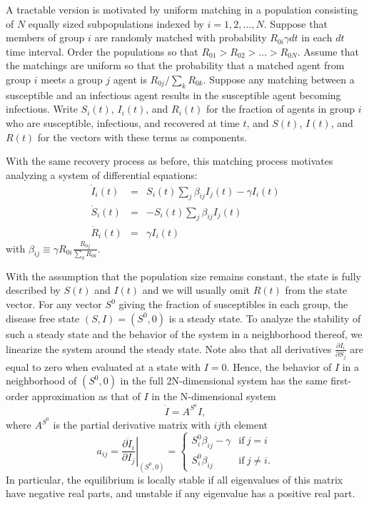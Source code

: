 \documentclass[11pt]{article}
\begin{document}
A tractable version is motivated by uniform matching in a population consisting of $N$ equally sized subpopulations indexed by 
$i = 1, 2, \ldots, N$. Suppose that members of group $i$ are randomly matched with probability $R_{0i} \gamma dt$ in each 
$dt$ time interval. Order the populations so that $R_{01} > R_{02} > \ldots > R_{0N}$. Assume that the matchings are uniform 
so that the probability that a matched agent from group $i$ meets a group $j$ agent is $R_{0j}/\sum_k R_{0k}$. Suppose any matching between a susceptible and an infectious agent 
results in the susceptible agent becoming infectious. Write $S_i(t)$, $I_i(t)$, and $R_i(t)$ for the fraction of agents in group $i$
who are susceptible, infectious, and recovered at time $t$, and $S(t)$, $I(t)$, and $R(t)$ for the vectors with these terms as
components. 

With the same recovery process as before, this matching process motivates analyzing a system of differential equations:
\begin{eqnarray*}
\dot{I}_i(t)  & = & S_i(t) \sum_j \beta_{ij} I_j(t) - \gamma I_i(t) \\
\dot{S}_i(t) & = & -S_i(t) \sum_j \beta_{ij} I_j(t) \\
\dot{R}_i(t) & = & \gamma I_i(t) 
\end{eqnarray*} 
with $\beta_{ij} \equiv \gamma R_{0i} \frac{R_{0j}}{\sum_k R_{0k}}$. 

With the assumption that the population size remains constant, the state is fully described by $S(t)$ and $I(t)$ and we will usually
omit $R(t)$ from the state vector.
For any vector $S^0$ giving the fraction of susceptibles in each group, the disease free state $(S, I) = (S^0, 0)$ 
is a steady state. To analyze the stability of such a steady state and the behavior of the system in a neighborhood thereof, we
linearize the system around the steady state. Note also that all derivatives 
$\frac{\partial \dot{I_i}}{\partial S_j}$ are equal to zero when evaluated at a state with $I = 0$. Hence, the behavior of $I$
in a neighborhood of $(S^0, 0)$ in the full  2N-dimensional system has the same first-order approximation as that of $I$ in
the N-dimensional system
$$
\dot{I} = A^{S^0} I,
$$
where $A^{S^0}$ is the partial derivative matrix with $ij$th element 
$$
a_{ij} = \left. \frac{\partial \dot{I}_i}{\partial I_j}\right|_{(S^0, 0)} = \left\{ \begin{array}{ll}
  S^0_i \beta_{ij} - \gamma & \mbox{if} \ j=i \\
  S^0_i \beta_{ij}                 & \mbox{if} \ j \neq i. 
  \end{array} \right.
$$
In particular, the equilibrium is locally stable if all eigenvalues of this matrix have negative real parts, and unstable if any
eigenvalue has a positive real part.
\end{document}
